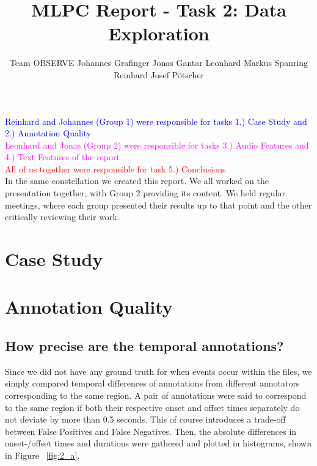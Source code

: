 \documentclass{article}
\title{MLPC Report  - Task 2: Data Exploration}
\author{%
  Team OBSERVE \AND
  Johannes Grafinger 
  \And
  Jonas Gantar 
  \And 
  Leonhard Markus Spanring 
  \And 
  Reinhard Josef Pötscher
}
\begin{document}
\maketitle
\begin{contributions}
  \textcolor{blue}{Reinhard and Johannes (Group 1) were responsible for tasks 1.) Case Study and 2.) Annotation Quality} \\ 
  \textcolor{magenta}{Leonhard and Jonas (Group 2) were responsible for tasks 3.) Audio Features and 4.) Text Features of the report} \\ 
  \textcolor{red}{All of us together were responsible for task 5.) Conclusions} \\ 
  In the same constellation we created this report. We all worked on the presentation together, with Group 2 providing its content. We held regular meetings, where each group presented their results up to that point and the other critically reviewing their work.
\end{contributions}

\section{Case Study}
\label{sec:Case Study}

\subsection{}
\label{sec:Case Study:a}

\subsection{}
\label{sec:Case Study:b}

\subsection{}
\label{sec:Case Study:c}

\pagebreak

\section{Annotation Quality} 
\label{sec:Annotation Quality}


\subsection{How precise are the temporal annotations?}
\label{sec:Annotation Quality:a1}
Since we did not have any ground truth for when events occur within the files, we simply compared temporal differences of annotations from different annotators corresponding to the same region. A pair of annotations were said to correspond to the same region if both their respective onset and offset times separately do not deviate by more than 0.5 seconds. This of course introduces a trade-off between False Positives and False Negatives.
Then, the absolute differences in onset-/offset times and durations were gathered and plotted in histograms, shown in Figure ~\ref{fig:2_a}.
\end{document}

